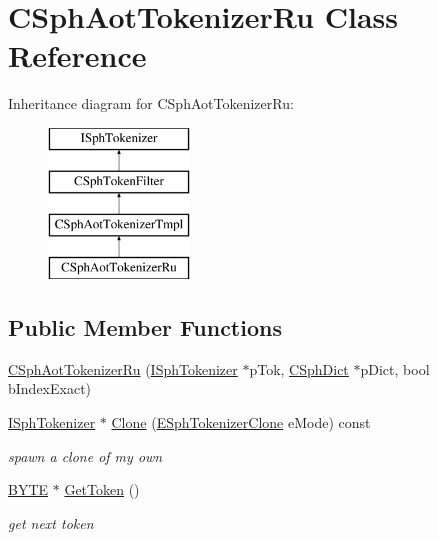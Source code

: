 \hypertarget{classCSphAotTokenizerRu}{\section{C\-Sph\-Aot\-Tokenizer\-Ru Class Reference}
\label{classCSphAotTokenizerRu}
}
Inheritance diagram for C\-Sph\-Aot\-Tokenizer\-Ru\-:\begin{figure}[H]
\begin{center}
\leavevmode
\includegraphics[height=4.000000cm]{classCSphAotTokenizerRu}
\end{center}
\end{figure}
\subsection*{Public Member Functions}
\begin{DoxyCompactItemize}
\item 
\hyperlink{classCSphAotTokenizerRu_a741ce017683c0e4f9f71dbde183216ab}{C\-Sph\-Aot\-Tokenizer\-Ru} (\hyperlink{classISphTokenizer}{I\-Sph\-Tokenizer} $\ast$p\-Tok, \hyperlink{classCSphDict}{C\-Sph\-Dict} $\ast$p\-Dict, bool b\-Index\-Exact)
\item 
\hyperlink{classISphTokenizer}{I\-Sph\-Tokenizer} $\ast$ \hyperlink{classCSphAotTokenizerRu_a6c97748b7aa378fcc26db57fbc7d788a}{Clone} (\hyperlink{sphinx_8h_adc6a6e1ffce224f14950be604087978c}{E\-Sph\-Tokenizer\-Clone} e\-Mode) const 
\begin{DoxyCompactList}\small\item\em spawn a clone of my own \end{DoxyCompactList}\item 
\hyperlink{sphinxstd_8h_a4ae1dab0fb4b072a66584546209e7d58}{B\-Y\-T\-E} $\ast$ \hyperlink{classCSphAotTokenizerRu_afa2f2ed6f5cf27cc0bc7df12547adf9d}{Get\-Token} ()
\begin{DoxyCompactList}\small\item\em get next token \end{DoxyCompactList}\end{DoxyCompactItemize}
